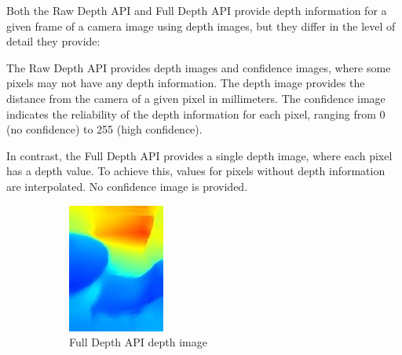 Both the Raw Depth API and Full Depth API provide depth information for a given frame of a camera image using depth images, but they differ in the level of detail they provide:

The Raw Depth API provides depth images and confidence images, where some pixels may not have any depth information.
The depth image provides the distance from the camera of a given pixel in millimeters.
The confidence image indicates the reliability of the depth information for each pixel, ranging from 0 (no confidence) to 255 (high confidence).

In contrast, the Full Depth API provides a single depth image, where each pixel has a depth value.
To achieve this, values for pixels without depth information are interpolated.
No confidence image is provided.
\begin{figure}[ht!]
    \centering
    \begin{subfigure}[b]{0.4\textwidth}
        \centering
        \includegraphics[width=0.8\linewidth]{images/depth_full-depth-image}
        \caption{Full Depth API depth image}
    \end{subfigure}%
    \begin{subfigure}[b]{0.4\textwidth}
        \centering

\end{subfigure}
\end{figure}

